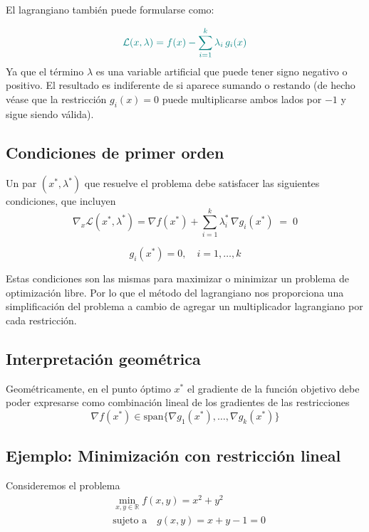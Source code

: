 \documentclass{article}
\begin{document}
El lagrangiano también puede formularse como:

\[\color{teal}
\mathcal{L}(x,\lambda)=f(x)-\sum_{i=1}^k\lambda_i\,g_i(x)
\]
Ya que el término $\lambda$ es una variable artificial que puede tener signo negativo o positivo. El resultado es indiferente de si aparece sumando o restando (de hecho véase que la restricción $g_i(x)=0$ puede multiplicarse ambos lados por $-1$ y sigue siendo  válida).

\subsection*{Condiciones de primer orden}

Un par \((x^*,\lambda^*)\) que resuelve el problema debe satisfacer las siguientes condiciones, que incluyen  
\begin{equation*}
\nabla_x \mathcal{L}(x^*,\lambda^*) = \nabla f(x^*) + \sum_{i=1}^k \lambda_i^*\,\nabla g_i(x^*)
\;=\;0
\label{eq:gradiente-zero}
\end{equation*}

\begin{equation*}
g_i(x^*)=0,\quad i=1,\dots,k
\label{eq:restricciones-cumplidas}
\end{equation*}

Estas condiciones son las mismas para maximizar o minimizar un problema de optimización libre. Por lo que el método del lagrangiano nos proporciona una simplificación del problema a cambio de agregar un multiplicador lagrangiano por cada restricción.

\subsection*{Interpretación geométrica}

Geométricamente, en el punto óptimo \(x^*\) el gradiente de la función objetivo debe poder expresarse como combinación lineal de los gradientes de las restricciones  
\[
\nabla f(x^*)\in\mathrm{span}\{\nabla g_1(x^*),\dots,\nabla g_k(x^*)\}
\]

\subsection*{Ejemplo: Minimización con restricción lineal}

Consideremos el problema  
\[
\begin{aligned}
&\min_{x,y\in\mathbb{R}} f(x,y)=x^2+y^2\\
&\text{sujeto a}\quad g(x,y)=x+y-1=0
\end{aligned}
\]
\end{document}
